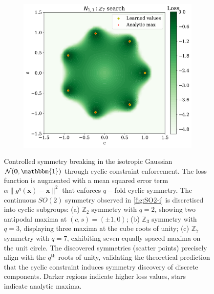 \begin{figure}
\begin{subfigure}[b]{0.31\textwidth}
        \caption{}
        \label{fig:MSE_ii}
    \end{subfigure}
    \hfill
    \begin{subfigure}[b]{0.31\textwidth}
        \centering
        \includegraphics[width=\textwidth]{figures/chapter-09/C7MSE.pdf}
        \caption{}
        \label{fig:MSE_iii}
    \end{subfigure}
    \caption[Controlled discretization of continuous $SO(2)$ symmetry into cyclic subgroups $\mathbb{Z}_q$ via constraint enforcement.]{Controlled symmetry breaking in the isotropic Gaussian $\mathcal{N}(\mathbf{0}, \mathbbm{1})$ through cyclic constraint enforcement. The loss function is augmented with a mean squared error term $\alpha \|g^q(\mathbf{x}) - \mathbf{x}\|^2$ that enforces $q-$fold cyclic symmetry. The continuous $SO(2)$ symmetry observed in \cref{fig:SO2-i} is discretised into cyclic subgroups: (a) $\mathbb{Z}_2$ symmetry with $q=2$, showing two antipodal maxima at $(c,s) = (\pm 1, 0)$; (b) $\mathbb{Z}_3$ symmetry with $q=3$, displaying three maxima at the cube roots of unity; (c) $\mathbb{Z}_7$ symmetry with $q=7$, exhibiting seven equally spaced maxima on the unit circle. The discovered symmetries (scatter points) precisely align with the $q^{\text{th}}$ roots of unity, validating the theoretical prediction that the cyclic constraint induces symmetry discovery of discrete components. Darker regions indicate higher loss values, stars indicate analytic maxima.}
    \label{fig:MSE}
\end{figure}               

